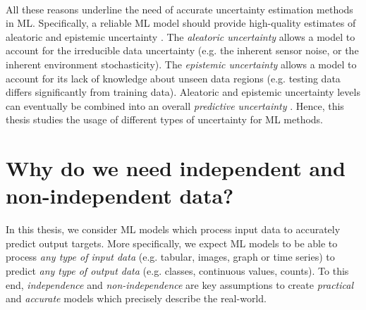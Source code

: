 \paragraph*{} All these reasons underline the need of accurate uncertainty estimation methods in ML. 
Specifically, a reliable ML model should provide high-quality estimates of aleatoric and epistemic uncertainty \citep{uncertainty-deep-learning}.
The \emph{aleatoric uncertainty} allows a model to account for the irreducible data uncertainty (e.g. the inherent sensor noise, or the inherent environment stochasticity).
The \emph{epistemic uncertainty} allows a model to account for its lack of knowledge about unseen data regions (e.g. testing data differs significantly from training data).
Aleatoric and epistemic uncertainty levels can eventually be combined into an overall \emph{predictive uncertainty} \citep{uncertainty-deep-learning}. Hence, this thesis studies the usage of different types of uncertainty for ML methods.


\section{Why do we need independent and non-independent data?}

In this thesis, we consider ML models which process input data to accurately predict output targets. 
More specifically, we expect ML models to be able to process \emph{any type of input data} (e.g. tabular, images, graph or time series) to predict \emph{any type of output data} (e.g. classes, continuous values, counts).
To this end, \emph{independence} and \emph{non-independence} are key assumptions to create \emph{practical} and \emph{accurate} models which precisely describe the real-world. 

